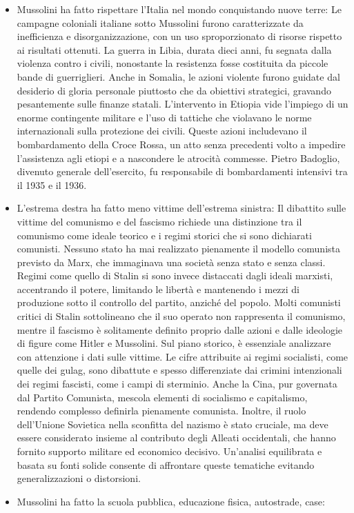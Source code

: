 \documentclass[12pt]{book} %
\begin{document}
\begin{mdframed}[linewidth=1pt]
\begin{itemize}
\item Mussolini ha fatto rispettare l’Italia nel mondo conquistando nuove terre: Le campagne coloniali italiane sotto Mussolini furono caratterizzate da inefficienza e disorganizzazione, con un uso sproporzionato di risorse rispetto ai risultati ottenuti. La guerra in Libia, durata dieci anni, fu segnata dalla violenza contro i civili, nonostante la resistenza fosse costituita da piccole bande di guerriglieri. Anche in Somalia, le azioni violente furono guidate dal desiderio di gloria personale piuttosto che da obiettivi strategici, gravando pesantemente sulle finanze statali. L'intervento in Etiopia vide l'impiego di un enorme contingente militare e l'uso di tattiche che violavano le norme internazionali sulla protezione dei civili. Queste azioni includevano il bombardamento della Croce Rossa, un atto senza precedenti volto a impedire l'assistenza agli etiopi e a nascondere le atrocità commesse. Pietro Badoglio, divenuto generale dell'esercito, fu responsabile di bombardamenti intensivi tra il 1935 e il 1936.
\item L'estrema destra ha fatto meno vittime dell'estrema sinistra: Il dibattito sulle vittime del comunismo e del fascismo richiede una distinzione tra il comunismo come ideale teorico e i regimi storici che si sono dichiarati comunisti. Nessuno stato ha mai realizzato pienamente il modello comunista previsto da Marx, che immaginava una società senza stato e senza classi. Regimi come quello di Stalin si sono invece distaccati dagli ideali marxisti, accentrando il potere, limitando le libertà e mantenendo i mezzi di produzione sotto il controllo del partito, anziché del popolo. Molti comunisti critici di Stalin sottolineano che il suo operato non rappresenta il comunismo, mentre il fascismo è solitamente definito proprio dalle azioni e dalle ideologie di figure come Hitler e Mussolini. Sul piano storico, è essenziale analizzare con attenzione i dati sulle vittime. Le cifre attribuite ai regimi socialisti, come quelle dei gulag, sono dibattute e spesso differenziate dai crimini intenzionali dei regimi fascisti, come i campi di sterminio. Anche la Cina, pur governata dal Partito Comunista, mescola elementi di socialismo e capitalismo, rendendo complesso definirla pienamente comunista. Inoltre, il ruolo dell’Unione Sovietica nella sconfitta del nazismo è stato cruciale, ma deve essere considerato insieme al contributo degli Alleati occidentali, che hanno fornito supporto militare ed economico decisivo. Un’analisi equilibrata e basata su fonti solide consente di affrontare queste tematiche evitando generalizzazioni o distorsioni.
\item Mussolini ha fatto la scuola pubblica, educazione fisica, autostrade, case:


\end{itemize}
\end{mdframed}
\end{document}
